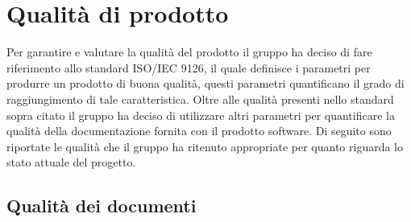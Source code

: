 \section{Qualità di prodotto}
	Per garantire e valutare la qualità del prodotto il gruppo ha deciso di fare riferimento allo standard ISO/IEC 9126, il quale definisce i parametri per produrre un prodotto di buona qualità, questi parametri quantificano il grado di raggiungimento di tale caratteristica. Oltre alle qualità presenti nello standard sopra citato il gruppo ha deciso di utilizzare altri parametri per quantificare la qualità della documentazione fornita con il prodotto software. Di seguito sono riportate le qualità che il gruppo ha ritenuto appropriate per quanto riguarda lo stato attuale del progetto.
	\subsection{Qualità dei documenti}
		
